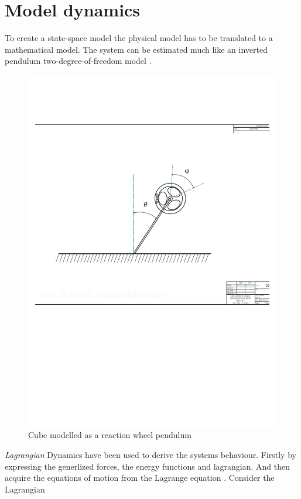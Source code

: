 \documentclass[a4paper,11pt]{kth-mag}
\begin{document}
\section{Model dynamics} \label{chapter: state space}
To create a state-space model the physical model has to be translated to a mathematical model. The system can be estimated much like an inverted pendulum two-degree-of-freedom model \cite{KTHpendulum}.
\begin{figure}[!htb]
\centering
\includegraphics[scale=.6]{Lagrangeflywheel.pdf}
\caption{Cube modelled as a reaction wheel pendulum}
\label{fig:Lagrangeflywheel}
\end{figure}

\emph{Lagrangian} Dynamics have been used to derive the systems behaviour. Firstly by expressing the generlized forces, the energy functions and lagrangian. And then acquire the equations of motion from the Lagrange equation  \cite{Lagrangeref}. Consider the Lagrangian
\end{document}

